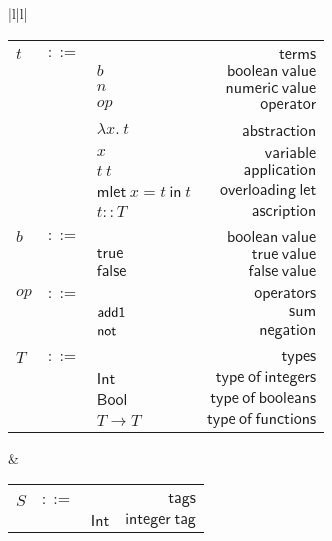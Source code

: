 \documentclass[preprint,authoryear,sort&compress,9pt,nocopyrightspace]{article}
\newcommand{\ascrip}[1]{#1::T}
\newcommand{\oletD}{\mathsf{mlet} \ x = t \ \mathsf{in}  \ t}
\newcommand{\app}[2]{#1 \ #2}
\newcommand{\absST}[2]{\lambda #1. \ #2}
\newcommand{\negacion}[1]{\mathsf{not} \ #1}
\newcommand{\suma}[1]{\mathsf{add1} \ #1}
\newcommand{\truet}{\mathsf{true}}
\newcommand{\falset}{\mathsf{false}}
\newcommand{\boolt}{\mathsf{Bool}}
\newcommand{\intt}{\mathsf{Int}}
\begin{document}
\setlength{\topmargin}{-25mm}
\setlength{\textheight}{230mm}
\begin{figure}
\begin{small}
\begin{center}
\hspace*{-2cm}
\begin{tabular}{|l|l|}
\hline
\begin{tabular}{l c l r}
&&&\\
$t$&$::=$&&$\mathsf {terms}$\\
&&$b$&$\mathsf {boolean \ value}$\\
&&$n$&$\mathsf {numeric \ value}$\\
&&$op$&$\mathsf{operator}$\\
&&$\absST {x}{t}$&\ $\mathsf {abstraction}$\\
&&$x$&$\mathsf {variable}$\\
&&$\app {t}{t}$&$\mathsf {application}$\\
&&$\oletD$&$\mathsf {overloading \ let}$\\
&&$\ascrip {t}$&$\mathsf {ascription}$\\
&&&\\
$b$&$::=$&&$\mathsf {boolean \ value}$\\
&&$\truet$&$\mathsf {true \ value}$\\
&&$\falset$&$\mathsf {false \ value}$\\
&&&\\
$op$&$::=$&&$\mathsf {operators}$\\
&&$\suma$&$\mathsf {sum}$\\
&&$\negacion$&$\mathsf{negation} $\\
&&&\\
$T$&$::=$&&$\mathsf {types}$\\
&&$\intt$&$\mathsf {type \ of \ integers}$\\
&&$\boolt$&$\mathsf {type \ of \ booleans}$\\
&&$T \to T$&$\mathsf {type \ of \ functions}$\\
\end{tabular}
& \begin{tabular}{l c l r}
&&&\\
$S$&$::=$&&$\mathsf {tags}$\\
&&$\intt$&$\mathsf {integer \ tag}$\\

\end{tabular}
\end{tabular}
\end{center}
\end{small}
\end{figure}
\end{document}
